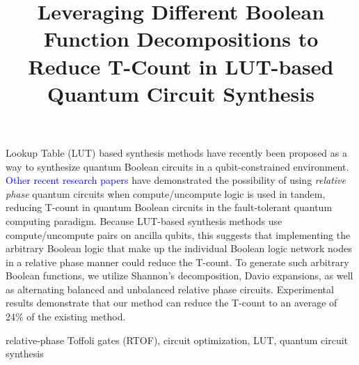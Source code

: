 \documentclass[paper]{ieice}
\title{Leveraging Different Boolean Function Decompositions to Reduce T-Count in LUT-based Quantum Circuit Synthesis}
\newcommand{\blueoutt}[1]{\textcolor{blue}{#1}}
\newcommand{\blueoutt}[1]{#1}
\begin{document}
\maketitle

\begin{summary}
  
  Lookup Table (LUT) based synthesis methods have recently been proposed as a way to synthesize quantum Boolean circuits
  in a qubit-constrained environment. \blueoutt{Other recent research papers} have demonstrated the possibility of using {\it relative phase}
  quantum circuits when compute/uncompute logic is used in tandem, reducing T-count in quantum Boolean circuits in
  the fault-tolerant quantum computing paradigm. Because LUT-based synthesis methods use compute/uncompute pairs on ancilla
  qubits, this suggests that implementing the arbitrary Boolean logic that make up the individual Boolean logic network nodes
  in a relative phase manner could reduce the T-count. To generate such arbitrary Boolean functions, we utilize Shannon's
  decomposition, Davio expansions, as well as alternating balanced and unbalanced relative  phase circuits. Experimental results
  demonstrate that our method can reduce the T-count to an average of 24\% of the existing method. 
  
\end{summary}
\begin{keywords}
relative-phase Toffoli gates (RTOF), circuit optimization, LUT, quantum circuit synthesis
\end{keywords}
\setlength\textfloatsep{4pt}
\setlength\floatsep{0pt}
\setlength\abovecaptionskip{4pt}










%
%

\vspace{-15mm}

\end{document}

